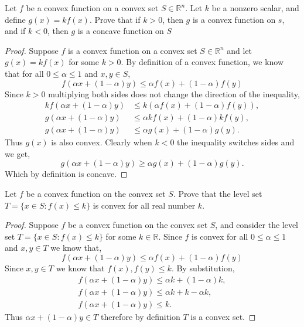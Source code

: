 \documentclass[12pt]{article}
\makeatletter
\theoremstyle{homework}
\newenvironment{exercise}[1]
{\def\@currentlabel{#1}\exercisecore}
{\endexercisecore}
\newcommand{\Reals}{\ensuremath{\mathbb R}}
\let\RR\Reals
\makeatother
\begin{document}
\begin{exercise}{3.7} Let $f$ be a convex function on a convex set $S \in \RR^n$. Let $k$ be a nonzero scalar, and define
  $g(x) = kf(x)$. Prove that if $k > 0$, then $g$ is a convex function on $s$, and if $k<0$, then $g$ is a concave function on $S$
  \begin{proof} Suppose $f$ is a convex function on a convex set $S \in \RR^n$ and let $g(x) = kf(x)$ for some $k>0$. 
    By definition of a convex function, we know that for all $0 \leq \alpha \leq 1$ and $x, y \in S$, 
    \begin{equation*}
      f(\alpha x + (1-\alpha)y) \leq \alpha f(x) + (1 - \alpha)f(y)
    \end{equation*}
    Since $k > 0$ multiplying both sides does not change the direction of the inequality, 
    \begin{align*}
      kf(\alpha x + (1-\alpha)y) &\leq k(\alpha f(x) + (1 - \alpha)f(y)),\\
      g(\alpha x + (1-\alpha)y) &\leq \alpha kf(x) + (1 - \alpha)kf(y),\\
      g(\alpha x + (1-\alpha)y) &\leq \alpha g(x) + (1 - \alpha)g(y).
    \end{align*}
    Thus $g(x)$ is also convex. Clearly when $k < 0$ the inequality switches sides and we get, 
    \begin{equation*}
      g(\alpha x + (1-\alpha)y) \geq \alpha g(x) + (1 - \alpha)g(y).
    \end{equation*}
    Which by definition is concave. 
    \end{proof}
\end{exercise}
\vspace{.5in}


\begin{exercise}{3.13} Let $f$ be a convex function on the convex set $S$. Prove that the level set
  $T = \{ x \in S: f(x) \leq k\}$ is convex for all real number $k$.
  \begin{proof} Suppose $f$ be a convex function on the convex set $S$, and consider the level set
    $T = \{ x \in S: f(x) \leq k\}$ for some $k \in \RR$. Since $f$ is convex for all 
    $0 \leq \alpha \leq 1$ and $x, y \in T$ we know that, 
    \begin{equation*}
      f(\alpha x + (1 - \alpha)y) \leq \alpha f(x) + (1 - \alpha)f(y)
    \end{equation*}
    Since $x, y \in T$ we know that $f(x), f(y) \leq k$. By substitution, 
    \begin{align*}
      f(\alpha x + (1 - \alpha)y) \leq \alpha k + (1 - \alpha)k,\\
      f(\alpha x + (1 - \alpha)y) \leq \alpha k + k - \alpha k,\\
      f(\alpha x + (1 - \alpha)y) \leq k.
    \end{align*}
    Thus $\alpha x + (1 - \alpha)y \in T$ therefore by definition $T$ is a convex set.  
  \end{proof}
\end{exercise}
\vspace{.5in}
\end{document}
